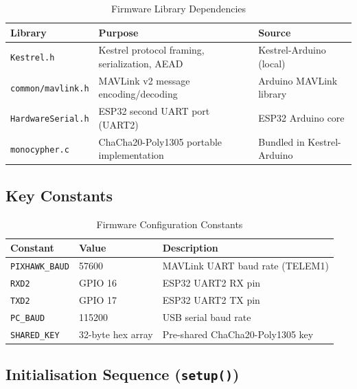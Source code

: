 \documentclass[11pt,a4paper]{article}
\begin{document}
\begin{table}[H]
    \centering
    \begin{tabularx}{\textwidth}{@{}lXl@{}}
        \toprule
        \textbf{Library} & \textbf{Purpose} & \textbf{Source} \\
        \midrule
        \texttt{Kestrel.h}    & Kestrel protocol framing, serialization, AEAD &
            Kestrel-Arduino (local) \\
        \texttt{common/mavlink.h} & MAVLink v2 message encoding/decoding &
            Arduino MAVLink library \\
        \texttt{HardwareSerial.h} & ESP32 second UART port (UART2) &
            ESP32 Arduino core \\
        \texttt{monocypher.c} & ChaCha20-Poly1305 portable implementation &
            Bundled in Kestrel-Arduino \\
        \bottomrule
    \end{tabularx}
    \caption{Firmware Library Dependencies}
\end{table}

\subsection{Key Constants}

\begin{table}[H]
    \centering
    \begin{tabular}{@{}lll@{}}
        \toprule
        \textbf{Constant}    & \textbf{Value}       & \textbf{Description} \\
        \midrule
        \texttt{PIXHAWK\_BAUD} & 57600              & MAVLink UART baud rate (TELEM1) \\
        \texttt{RXD2}          & GPIO 16            & ESP32 UART2 RX pin \\
        \texttt{TXD2}          & GPIO 17            & ESP32 UART2 TX pin \\
        \texttt{PC\_BAUD}      & 115200             & USB serial baud rate \\
        \texttt{SHARED\_KEY}   & 32-byte hex array  & Pre-shared ChaCha20-Poly1305 key \\
        \bottomrule
    \end{tabular}
    \caption{Firmware Configuration Constants}
\end{table}

\subsection{Initialisation Sequence (\texttt{setup()})}
\end{document}

